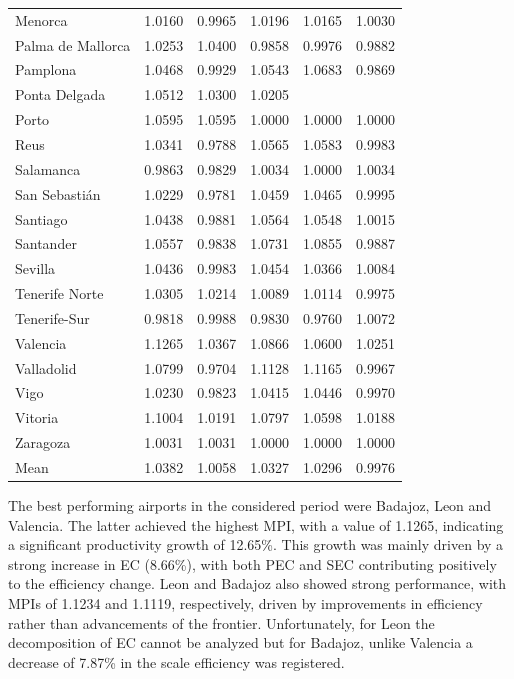 \begin{table}[t!]
{\begin{tabular}{lccccc}
Menorca & 1.0160 & 0.9965 & 1.0196 & 1.0165 & 1.0030 \\
Palma de Mallorca & 1.0253 & 1.0400 & 0.9858 & 0.9976 & 0.9882 \\
Pamplona & 1.0468 & 0.9929 & 1.0543 & 1.0683 & 0.9869 \\
Ponta Delgada & 1.0512& 1.0300 & 1.0205 &  &  \\
Porto & 1.0595 & 1.0595 & 1.0000 & 1.0000 & 1.0000 \\
Reus & 1.0341 & 0.9788 & 1.0565 & 1.0583 & 0.9983 \\
Salamanca & 0.9863 & 0.9829 & 1.0034 & 1.0000 & 1.0034 \\
San Sebastián & 1.0229 & 0.9781 & 1.0459 & 1.0465 & 0.9995 \\
Santiago & 1.0438 & 0.9881 & 1.0564 & 1.0548 & 1.0015 \\
Santander & 1.0557 & 0.9838 & 1.0731 & 1.0855 & 0.9887 \\
Sevilla & 1.0436 & 0.9983 & 1.0454 & 1.0366 & 1.0084 \\
Tenerife Norte & 1.0305 & 1.0214 & 1.0089 & 1.0114 & 0.9975 \\
Tenerife-Sur & 0.9818 & 0.9988 & 0.9830 & 0.9760 & 1.0072 \\
Valencia & 1.1265& 1.0367 & 1.0866 &1.0600 & 1.0251 \\
Valladolid & 1.0799 & 0.9704 & 1.1128 & 1.1165 & 0.9967 \\
Vigo & 1.0230 & 0.9823 & 1.0415 & 1.0446 & 0.9970 \\
Vitoria & 1.1004 & 1.0191 & 1.0797 & 1.0598 & 1.0188 \\
Zaragoza & 1.0031 & 1.0031 & 1.0000 & 1.0000 & 1.0000 \\
 \midrule
 Mean & 1.0382
 & 1.0058  
 & 1.0327
 &1.0296
 & 0.9976
 \\
 \midrule
\end{tabular}%
}
\end{table}


The best performing airports in the considered period were Badajoz, Leon and Valencia. The latter
achieved the highest MPI, with a value of 1.1265, indicating a significant productivity growth of 12.65\%.
This growth was mainly driven by a strong increase in EC (8.66\%), with both PEC and SEC contributing
positively to the efficiency change. Leon and Badajoz also showed strong performance, with MPIs of
1.1234 and 1.1119, respectively, driven by improvements in efficiency rather than advancements of the
frontier. Unfortunately, for Leon the decomposition of EC cannot be analyzed but for Badajoz, unlike
Valencia a decrease of 7.87\% in the scale efficiency was registered.

